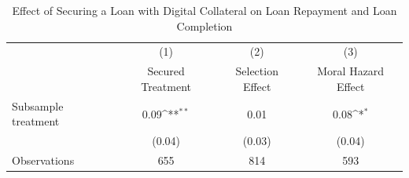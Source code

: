 \begin{table}[htbp]\centering
\def\sym#1{\ifmmode^{#1}\else\(^{#1}\)\fi}
\caption{Effect of Securing a Loan with Digital Collateral on Loan Repayment and Loan Completion\label{LASMH\_complete\_ITT\_110}}
\begin{tabular}{l*{3}{c}}
\toprule
                    &\multicolumn{1}{c}{(1)}&\multicolumn{1}{c}{(2)}&\multicolumn{1}{c}{(3)}\\
                    &\multicolumn{1}{c}{Secured Treatment}&\multicolumn{1}{c}{Selection Effect}&\multicolumn{1}{c}{Moral Hazard Effect}\\
\midrule
Subsample treatment &        0.09\sym{**} &        0.01         &        0.08\sym{*}  \\
                    &      (0.04)         &      (0.03)         &      (0.04)         \\
\midrule
Observations        &         655         &         814         &         593         \\
\bottomrule
\end{tabular}
\end{table}
